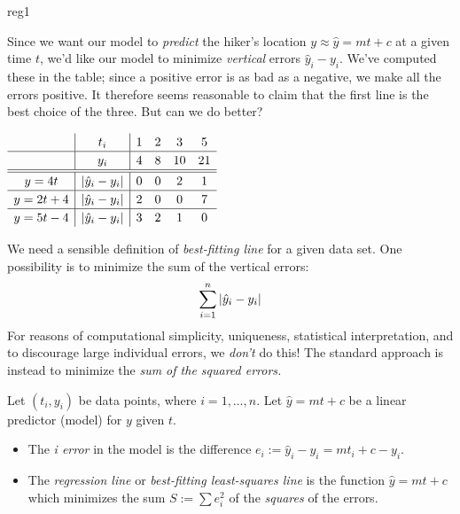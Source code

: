 \begin{example}{}{reg1}
	\begin{minipage}[t]{0.59\linewidth}\vspace{-10pt}
		Since we want our model to \emph{predict} the hiker's location $y\approx \hat y=mt+c$ at a given time $t$, we'd like our model to minimize \emph{vertical} errors $\hat y_i-y_i$. We've computed these in the table; since a positive error is as bad as a negative, we make all the errors positive. It therefore seems reasonable to claim that the first line is the best choice of the three.\smallbreak
		But can we do better?
	\end{minipage}
	\hfill
	\begin{minipage}[t]{0.4\linewidth}\vspace{0pt}
		\flushright $\def\arraystretch{1.2}
		\begin{array}[t]{c|c|ccccc}
			&t_i&1&2&3&5\\\hline
			&y_i&4&8&10&21\\\hline\hline
			y=4t&\nm{\hat y_i-y_i}&0&0&2&1\\\hline
			y=2t+4&\nm{\hat y_i-y_i}&2&0&0&7\\\hline
			y=5t-4&\nm{\hat y_i-y_i}&3&2&1&0
		\end{array}$
	\end{minipage}
\end{example}


\goodbreak

We need a sensible definition of \emph{best-fitting line} for a given data set. One possibility is to minimize the sum of the vertical errors:
\[
	\sum_{i=1}^n\left| \hat y_i-y_i\right|
\]
For reasons of computational simplicity, uniqueness, statistical interpretation, and to discourage large individual errors, we \emph{don't} do this! The standard approach is instead to minimize the \emph{sum of the squared errors.}


\begin{defn}{}{}
	Let $(t_i,y_i)$ be data points, where $i=1,\ldots,n$. Let $\hat y=mt+c$ be a linear predictor (model) for $y$ given $t$.
	\begin{itemize}\itemsep0pt
	  \item The \emph{i\th{} error} in the model is the difference $e_i:=\hat y_i-y_i=mt_i+c-y_i$.
	  \item The \emph{regression line} or \emph{best-fitting least-squares line} is the function $\hat y=mt+c$ which minimizes the sum $S:=\sum e_i^2$ of the \emph{squares} of the errors.
	\end{itemize}
\end{defn}

